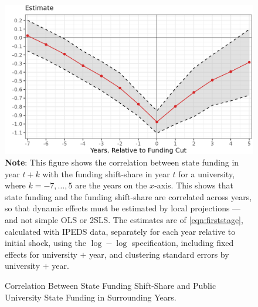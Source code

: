 \begin{figure}[H]
    \centering
    \singlespacing
    \caption{Correlation Between State Funding Shift-Share and Public University State Funding in Surrounding Years.}
    \includegraphics[width=\textwidth]{figures/lag-firststage.png}
    \label{fig:lag-firststage}
    \justify
    \footnotesize
    \textbf{Note}:
    This figure shows the correlation between state funding in year $t+k$ with the funding shift-share in year $t$ for a university, where $k = -7, \hdots, 5$ are the years on the $x$-axis.
    This shows that state funding and the funding shift-share are correlated across years, so that dynamic effects must be estimated by local projections --- and not simple OLS or 2SLS.
    The estimates are of \eqref{eqn:firststage}, calculated with IPEDS data, separately for each year relative to initial shock, using the $\log-\log$ specification, including fixed effects for university $+$ year, and clustering standard errors by university $+$ year.
\end{figure}

